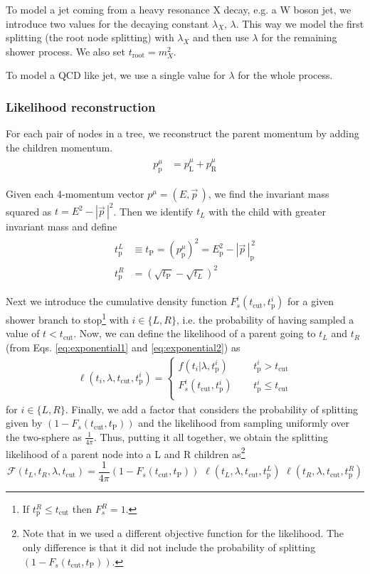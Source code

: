 \documentclass[12pt]{article}
\def\beq{\begin{equation}}
\def\eeq{\end{equation}}
\def\beq{\begin{equation}}
\def\eeq{\end{equation}}
\newcommand{\bea}{\begin{eqnarray}\begin{aligned}}
\newcommand{\eea}{\end{aligned}\end{eqnarray}}
\begin{document}
To model a jet coming from a heavy resonance X decay, e.g. a W boson jet, we introduce two values for the decaying constant $\lambda_X, \, \lambda$. This way we model the first splitting (the root node splitting) with $\lambda_X$ and then use $\lambda$ for the remaining shower process. We also set $t_\text{root} = m_X^2$.

To model a QCD like jet, we use a single value for $\lambda$ for the whole process.


\subsubsection{Likelihood reconstruction}

For each pair of nodes in a tree, we reconstruct the parent momentum by adding the children momentum. 
\bea
{p}^\mu_\text{p} &= p^\mu_\text{L}+ p^\mu_\text{R}
\eea


Given each 4-momentum vector $p^\mu = (E, \vec{p}\,)$, we find the invariant mass squared as $t= E^2-|\vec{p}\,|^2$. 
Then we identify $t_L$ with the child with greater invariant mass and define
\bea\label{parentmasses}
t_\text{p}^L & \equiv t_{\text{P}}= (p_\text{p}^\mu)^2 = E_\text{p}^2 - |\vec{p}\,|_\text{p}^{\,2}\\
t_\text{p}^R & = (\sqrt{t_{\text{P}}}-\sqrt{t_L})^2
\eea

Next we introduce the cumulative density function $F_s^i(t_{\text{cut}},t_{\text{p}}^i)$ for a given shower branch to stop\footnote{If $t_\text{p}^R \leq t_{\text{cut}}$ then $F_s^R=1$.} with $i \in \{L,R\}$, i.e. the probability of having sampled a value of $t < t_{\text{cut}}$. Now, we can define the likelihood of a parent going to $t_L$ and $t_R$ (from Eqs. \ref{eq:exponential1} and \ref{eq:exponential2}) as
\begin{eqnarray}
\ell(t_i, \lambda,t_\text{cut},  t_{\text{p}}^i) =
\left\{    
\begin{matrix}
f(t_i | \lambda, t_{\text{p}}^i)\,\,\,\,\,\,\,\, & t_{\text{p}}^i>t_\text{cut}\\
F_s^i(t_{\text{cut}}, t_{\text{p}}^i) \,\,\,\,\,\,\,\,& t_{\text{p}}^i\leq t_\text{cut} \\
\end{matrix}\right.
\end{eqnarray}
for $i \in \{L,R\}$.
Finally, we add a factor that considers the probability of splitting given by $(1-F_s(t_{\text{cut}}, t_{\text{P}}))$ and the likelihood from sampling uniformly over the two-sphere as $\frac{1}{4 \pi}$. Thus, putting it all together, we obtain the splitting likelihood of a parent node into a L and R children as\footnote{Note that in \cite{Cranmer:2021gdt, Greenberg:2021nrg, Brehmer:2020brs, Greenberg:2020heb}  we used a different objective function for the likelihood. The only difference is that it did not include the probability of splitting  $(1-F_s(t_{\text{cut}},t_{\text{P}}))$.}
\beq
\mathcal{F}(t_L,t_R, \lambda,t_{\text{cut}}) = \frac{1}{4 \pi} (1-F_s(t_{\text{cut}},t_{\text{P}})) \,\, \ell(t_L, \lambda,t_\text{cut},  t_{\text{p}}^L) \,\, \ell(t_R, \lambda,t_\text{cut},  t_{\text{p}}^R) 
\eeq
\end{document}
